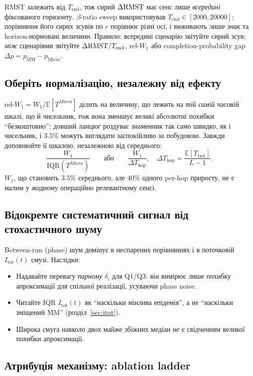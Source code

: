 \documentclass[11pt,a4paper]{article}
\begin{document}
RMST залежить від $T_{\mathrm{end}}$, тож сирий $\Delta\mathrm{RMST}$ має сенс лише
\emph{всередині} фіксованого горизонту.  $\beta$-ratio sweep використовував
$T_{\mathrm{end}}\in[2000,20000]$; порівняння його сирих зсувів по $r$ порівнює
різні осі, і виживають лише \emph{знак} та horizon-нормовані величини.
Правило: всередині сценарію звітуйте сирий зсув; \emph{між} сценаріями
звітуйте $\Delta\mathrm{RMST}/T_{\mathrm{end}}$, rel-$W_1$ або completion-probability gap
$\Delta p = p_{\mathrm{MM}}-p_{\mathrm{Micro}}$.

\subsection{Оберіть нормалізацію, незалежну від ефекту}
\label{sec:norm}

\mbox{rel-}$W_1 = W_1 / \mathbb{E}[T^{Micro}]$ ділить на величину, що лежить
на \emph{тій самій} часовій шкалі, що й чисельник, тож вона зменшує великі абсолютні
похибки ``безкоштовно'': довший ланцюг роздуває знаменник так само швидко, як і
чисельник, і $3.5\%$ можуть виглядати заспокійливо за побудовою.  Завжди
доповнюйте її шкалою, незалежною від середнього:
\[
  \frac{W_1}{\mathrm{IQR}(T^{Micro})}
  \qquad\text{або}\qquad
  \frac{W_1}{\Delta T_{\mathrm{hop}}},\quad
  \Delta T_{\mathrm{hop}} = \frac{\mathbb{E}[T_{\mathrm{last}}]}{L-1}.
\]
$W_1$, що становить $3.5\%$ середнього, але $40\%$ одного per-hop приросту,
не є малим у жодному операційно релевантному сенсі.

\subsection{Відокремте систематичний сигнал від стохастичного шуму}

Between-run (phase) шум домінує в неспарених порівняннях і в поточковій
$I_{\mathrm{tot}}(t)$ смузі.  Наслідки:
\begin{itemize}
  \item Надавайте перевагу \emph{парному} $\delta_i$ для Q1/Q3: він вимірює лише
        похибку апроксимації для спільної реалізації, усуваючи phase noise.
  \item Читайте IQR $I_{\mathrm{tot}}(t)$ як ``наскільки мінлива епідемія'',
        а не ``наскільки зміщений MM'' (розділ~\ref{sec:itot}).
  \item Широка смуга навколо двох майже збіжних медіан \emph{не} є свідченням
        великої похибки апроксимації.
\end{itemize}

\subsection{Атрибуція механізму: ablation ladder}
\label{sec:ladder}
\end{document}
